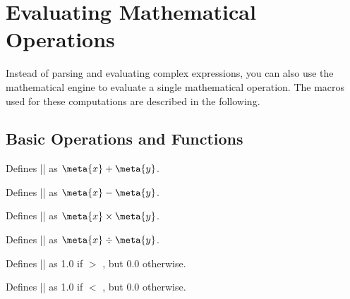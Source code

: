 %
%
%

\section{Evaluating Mathematical Operations}

\label{pgfmath-commands}

Instead of parsing and evaluating complex expressions, you can also
use the mathematical engine to evaluate a single mathematical
operation. The macros used for these computations are described in the
following. 


\subsection{Basic Operations and Functions}

\label{pgfmath-operations}

\begin{command}{\pgfmathadd{}}  
	Defines |\pgfmathresult| as $\meta{x}+\meta{y}$.
\end{command}

\begin{command}{\pgfmathsubtract{}}      
	Defines |\pgfmathresult| as $\meta{x}-\meta{y}$.                                       
\end{command}

\begin{command}{\pgfmathmultiply{}}      
	Defines |\pgfmathresult| as $\meta{x}\times\meta{y}$.                                
\end{command}

\begin{command}{\pgfmathdivide{}}        
	Defines |\pgfmathresult| as $\meta{x}\div\meta{y}$.                                 
\end{command}

\begin{command}{\pgfmathgreaterthan{}}   
	Defines |\pgfmathresult| as 1.0 if  $>$ , but 0.0 otherwise.                 
\end{command}

\begin{command}{\pgfmathlessthan{}} 
	Defines |\pgfmathresult| as 1.0 if  $<$ , but 0.0 otherwise.             
\end{command}
	
